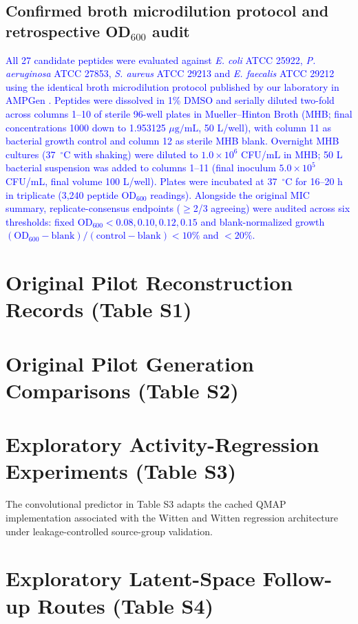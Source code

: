 \documentclass[11pt,a4paper]{article}
\newcommand{\ug}{\ensuremath{\mu\mathrm{g}/\mathrm{mL}}}
\newcommand{\rev}[1]{\textcolor{blue}{#1}}
\begin{document}
\subsection*{Confirmed broth microdilution protocol and retrospective OD$_{600}$ audit}
\rev{All 27 candidate peptides were evaluated against \textit{E. coli} ATCC 25922, \textit{P. aeruginosa} ATCC 27853, \textit{S. aureus} ATCC 29213 and \textit{E. faecalis} ATCC 29212 using the identical broth microdilution protocol published by our laboratory in AMPGen \cite{ref9}. Peptides were dissolved in 1\% DMSO and serially diluted two-fold across columns 1--10 of sterile 96-well plates in Mueller--Hinton Broth (MHB; final concentrations 1000 down to 1.953125 \ug, 50 \textmu{}L/well), with column 11 as bacterial growth control and column 12 as sterile MHB blank. Overnight MHB cultures (37~$^\circ$C with shaking) were diluted to $1.0\times 10^6$ CFU/mL in MHB; 50 \textmu{}L bacterial suspension was added to columns 1--11 (final inoculum $5.0\times 10^5$ CFU/mL, final volume 100 \textmu{}L/well). Plates were incubated at 37~$^\circ$C for 16--20 h in triplicate (3,240 peptide OD$_{600}$ readings). Alongside the original MIC summary, replicate-consensus endpoints ($\geq$2/3 agreeing) were audited across six thresholds: fixed OD$_{600}<0.08, 0.10, 0.12, 0.15$ and blank-normalized growth $(\mathrm{OD}_{600}-\mathrm{blank})/(\mathrm{control}-\mathrm{blank})<10\%$ and $<20\%$.}

\section{Original Pilot Reconstruction Records (Table S1)}


\section{Original Pilot Generation Comparisons (Table S2)}


\section{Exploratory Activity-Regression Experiments (Table S3)}
The convolutional predictor in Table S3 adapts the cached QMAP implementation \cite{ref13} associated with the Witten and Witten regression architecture \cite{ref12} under leakage-controlled source-group validation.


\section{Exploratory Latent-Space Follow-up Routes (Table S4)}

\end{document}
